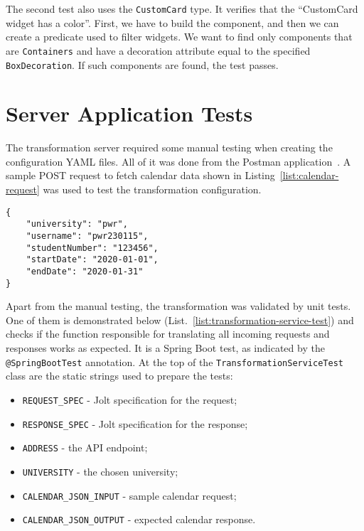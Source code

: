 The second test also uses the \texttt{CustomCard} type. It verifies that the ``CustomCard widget has a color''. First, we have to build the component, and then we can create a predicate used to filter widgets. We want to find only components that are \texttt{Containers} and have a decoration attribute equal to the specified \texttt{BoxDecoration}. If such components are found, the test passes.




\section{Server Application Tests}
The transformation server required some manual testing when creating the configuration YAML files. All of it was done from the Postman application~\cite{postman}. A sample POST request to fetch calendar data shown in Listing~\ref{list:calendar-request} was used to test the transformation configuration.

\begin{lstlisting}[label=list:calendar-request,caption=Sample content of the POST request to fetch calendar data]
{
	"university": "pwr",
	"username": "pwr230115",
	"studentNumber": "123456",
	"startDate": "2020-01-01",
	"endDate": "2020-01-31"
}
\end{lstlisting}

Apart from the manual testing, the transformation was validated by unit tests. One of them is demonstrated below (List.~\ref{list:transformation-service-test}) and checks if the function responsible for translating all incoming requests and responses works as expected. It is a Spring Boot test, as indicated by the \texttt{@SpringBootTest} annotation. At the top of the \texttt{TransformationServiceTest} class are the static strings used to prepare the tests:
\begin{itemize}
    \item \texttt{REQUEST\_SPEC} - Jolt specification for the request;
    \item \texttt{RESPONSE\_SPEC} - Jolt specification for the response;
    \item \texttt{ADDRESS} - the API endpoint;
    \item \texttt{UNIVERSITY} - the chosen university;
    \item \texttt{CALENDAR\_JSON\_INPUT} - sample calendar request;
    \item \texttt{CALENDAR\_JSON\_OUTPUT} - expected calendar response.
\end{itemize}

